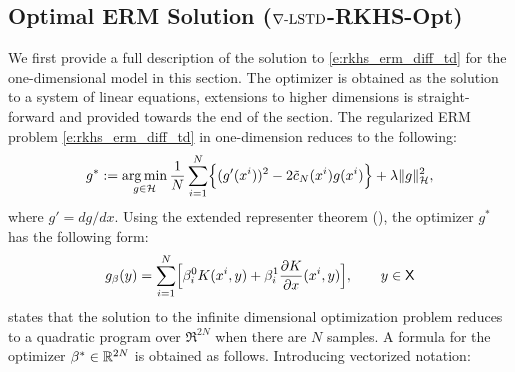 \subsection{Optimal ERM Solution ($\nabla\text{-LSTD}$-RKHS-Opt)}
\label{s:one_dimension}
We first provide a full description of the solution to \eqref{e:rkhs_erm_diff_td} for the one-dimensional model in this section. The optimizer is obtained as the solution to a system of linear equations, extensions to higher dimensions is straight-forward and provided towards the end of the section. 
The regularized ERM problem \eqref{e:rkhs_erm_diff_td} in one-dimension reduces to the following:
\begin{equation}
g^* := \argmin_{g\in\clH} \frac{1}{N} \sum_{i=1}^N \Bigl\{ (g'(x^i))^2 - 2 \tilc_N(x^i) g(x^i) \Bigr\} + \lambda \|g\|^2_\clH,
\label{e:rkhs_1dloss}
\end{equation}
where $g' = d g / d x$. Using the extended representer theorem (), the optimizer $g^*$ has the following form:
\begin{equation}
g_\rkhsparam(y)= \sum_{i=1}^N \Bigl[\rkhsparam_i^{0} K(x^i,y) + \rkhsparam_i^{1} \frac{\partial K}{\partial x}(x^i,y)\Bigr], \qquad y \in \state
\label{e:rkhs_g_star}
\end{equation}
  states that the solution to  the infinite dimensional optimization problem reduces to a quadratic program over $\Re^{2N}$ when there are $N$ samples. A formula for the optimizer  $\beta^* \in \mathbb{R}^{2N}$ is obtained as follows.
Introducing vectorized notation:
